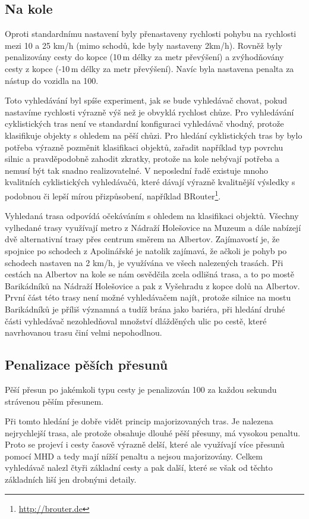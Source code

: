 \subsection{Na kole}
Oproti standardnímu nastavení byly přenastaveny rychlosti pohybu na rychlosti
mezi 10 a 25 km/h (mimo schodů, kde byly nastaveny 2km/h). Rovněž byly
penalizovány cesty do kopce (10\,m délky za metr převýšení) a zvýhodňovány cesty z
kopce (-10\,m délky za metr převýšení). Navíc byla nastavena penalta za nástup
do vozidla na 100.

Toto vyhledávání byl spíše experiment, jak se bude vyhledávač chovat, pokud
nastavíme rychlosti výrazně výš než je obvyklá rychlost chůze. Pro vyhledávání
cyklistických tras není ve standardní konfiguraci vyhledávač vhodný, protože
klasifikuje objekty s ohledem na pěší chůzi. Pro hledání cyklistických tras by
bylo potřeba výrazně pozměnit klasifikaci objektů, zařadit například typ povrchu
silnic a pravděpodobně zahodit zkratky, protože na kole nebývají potřeba a
nemusí být tak snadno realizovatelné. V neposlední řadě existuje mnoho
kvalitních cyklistických vyhledávačů, které dávají výrazně kvalitnější výsledky
s podobnou či lepší mírou přizpůsobení, například
BRouter\footnote{\url{http://brouter.de}}.

Vyhledaná trasa odpovídá očekáváním s ohledem na klasifikaci objektů. Všechny
vylhedané trasy využívají metro z Nádraží Holešovice na Muzeum a dále nabízejí
dvě alternativní trasy přes centrum směrem na Albertov. Zajímavostí je, že
spojnice po schodech z Apolinářské je natolik zajímavá, že ačkoli je pohyb po
schodech nastaven na 2 km/h, je využívána ve všech nalezených trasách. Při
cestách na Albertov na kole se nám osvědčila zcela odlišná trasa, a to po mostě
Barikádníků na Nádraží Holešovice a pak z Vyšehradu z kopce dolů na Albertov.
První část této trasy není možné vyhledávačem najít, protože silnice na mostu
Barikádníků je příliš významná a tudíž brána jako bariéra, při hledání druhé
části vyhledávač nezohledňoval množství dlážděných ulic po cestě, které
navrhovanou trasu činí velmi nepohodlnou.

\subsection{Penalizace pěších přesunů}
Pěší přesun po jakémkoli typu cesty je penalizován 100 za každou sekundu
strávenou pěším přesunem.

Při tomto hledání je dobře vidět princip majorizovaných tras. Je nalezena
nejrychlejší trasa, ale protože obsahuje dlouhé pěší přesuny, má vysokou
penaltu. Proto se projeví i cesty časově výrazně delší, které ale využívají více
přesunů pomocí MHD a tedy mají nížší penaltu a nejsou majorizovány. Celkem
vyhledávač nalezl čtyři základní cesty a pak další, které se však od těchto
základních liší jen drobnými detaily.
